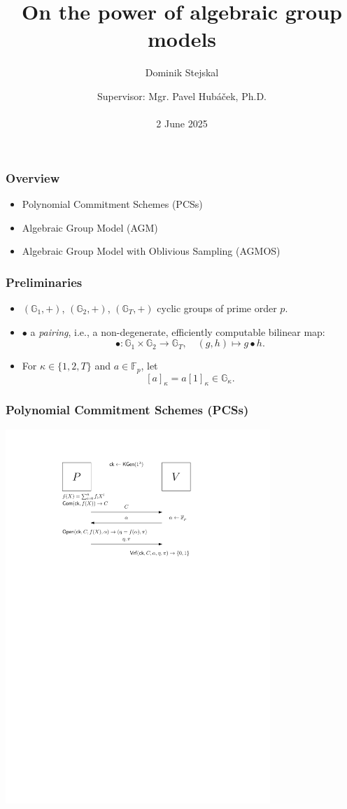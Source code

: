 \documentclass[9pt]{beamer}
\title{On the power of algebraic group models}
\author{Dominik Stejskal}
\date{Supervisor: Mgr. Pavel Hubáček, Ph.D.\\ \, \\2 June 2025}
\newcommand{\F}{\mathbb{F}}
\newcommand{\G}{\mathbb{G}}
\begin{document}
\frame{\titlepage}




\begin{frame}
\frametitle{Overview}
\begin{itemize}
    \item Polynomial Commitment Schemes (PCSs)
    \item Algebraic Group Model (AGM)
    \item Algebraic Group Model with Oblivious Sampling (AGMOS)
\end{itemize}
\end{frame}


\begin{frame}
\frametitle{Preliminaries}
\begin{itemize}
    \item $ (\G_1, +) $, $ (\G_2, +) $, $ (\G_T, +) $ cyclic groups of prime order $ p $.
    \item $ \bullet $ a \textit{pairing}, i.e., a non-degenerate, efficiently computable bilinear map:
    \[
    \bullet \colon \G_1 \times \G_2 \to \G_T, \quad (g, h) \mapsto g \bullet h.
    \]
    \item For $ \kappa \in \{ 1, 2, T \} $ and $ a \in \F_p $, let 
    \[
    [a]_\kappa = a[1]_\kappa \in \G_\kappa.
    \]
\end{itemize}
\end{frame}


\begin{frame}
\frametitle{Polynomial Commitment Schemes (PCSs)}
    \includegraphics[width=10cm]{pcs-definition.pdf}
\end{frame}
\end{document}

